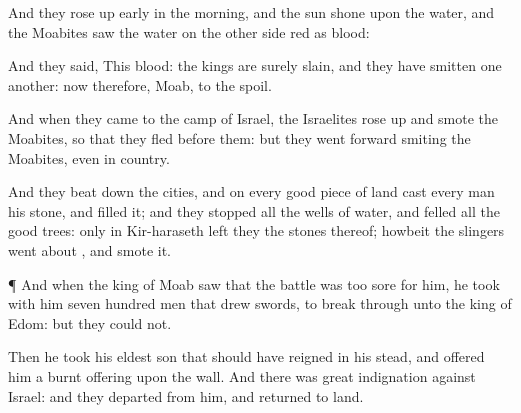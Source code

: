 {And they rose up
early in the
morning, and the
sun
shone upon the
water, and the
Moabites
saw the
water on the other
side
{}
red as
blood:

And they
said, This
{}
blood: the
kings are
surely
slain, and they have
smitten
one
another: now therefore,
Moab, to the
spoil.

And when they
came to the
camp of
Israel, the
Israelites rose
up and
smote the
Moabites, so that they
fled
before them: but they went
forward
smiting the
Moabites, even in
{} country.

And they beat
down the
cities, and on every
good
piece of land
cast every
man his
stone, and
filled it; and they
stopped all the
wells of
water, and
felled all the
good
trees: only in
Kir-haraseth
left they the
stones thereof; howbeit the
slingers went
about
{}, and
smote it.


\par }{\PP {}¶ And when the
king of
Moab
saw that the
battle was too
sore for him, he
took with him
seven
hundred
men that
drew
swords, to break
through
{} unto the
king of
Edom: but they
could not.

Then he
took his
eldest
son that should have
reigned in his stead, and
offered him
{} a burnt
offering upon the
wall. And there was
great
indignation against
Israel: and they
departed from him, and
returned to
{}
land.




\par }
